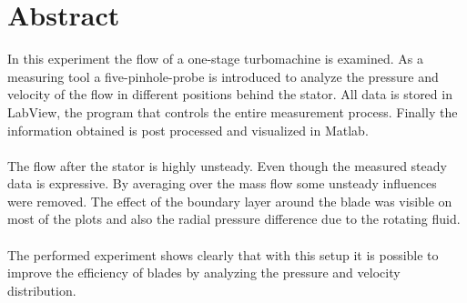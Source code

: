 



 \setcounter{tocdepth}{2}
 \tableofcontents



 \listoffigures %
 \cleardoublepage

 \listoftables  %


\chapter*{Abstract}

In this experiment the flow of a one-stage turbomachine is examined. As a measuring tool a five-pinhole-probe is introduced to analyze the pressure and velocity of the flow in different positions behind the stator. All data is stored in LabView, the program that controls the entire measurement process. Finally the information obtained is post processed and visualized in Matlab.\\\\
The flow after the stator is highly unsteady.  Even though the measured steady data is expressive. By averaging over the mass flow some unsteady influences were removed. The effect of the boundary layer around the blade was visible on most of the plots and also the radial pressure difference due to the rotating fluid.\\\\
The performed experiment shows clearly that with this setup it is possible to improve the efficiency of blades by analyzing the pressure and velocity distribution.



